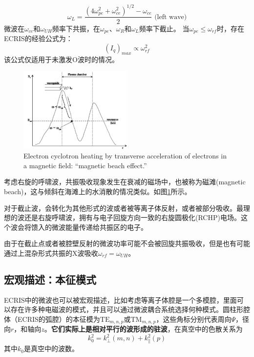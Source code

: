 \documentclass[fontset=windows]{article}
\begin{document}
\begin{enumerate}
\begin{enumerate}
\begin{equation}
        \end{equation}
        \begin{equation}
            \omega_L=\frac{(4\omega_{pe}^2+\omega_{ce}^2)^{1/2}-\omega_{ce}}{2}\text{  (left wave)}
        \end{equation}
        微波在$\omega_{ce}$和$\omega_{UH}$频率下共振，在$\omega_{pe}$、$\omega_{R}$和$\omega_{L}$频率下截止。
        当$\omega_{pe}\le\omega_{rf}$时，存在ECRIS的经验公式为：
        \begin{equation}
            (I_q)_{max}\propto\omega_{rf}^2
            \label{w^2}
        \end{equation}
        该公式仅适用于未激发O波时的情况。
    \end{enumerate}
\end{enumerate}
\begin{figure}
    \centering
    \includegraphics[width=0.5\textwidth]{magnetic beach effect.png}
    \caption{Electron cyclotron heating by transverse acceleration of electrons in a magnetic field: “magnetic beach effect.”}
    \label{f-1}
\end{figure}

考虑右旋的呼啸波，共振吸收现象发生在衰减的磁场中，也被称为磁滩(magnetic beach)，这与倾斜在海滩上的水消散的情况类似。如图\ref{f-1}所示。

对于截止波，会转化为其他形式的波或者被等离子体反射，或者被部分吸收。最理想的波还是右旋呼啸波，拥有与电子回旋方向一致的右旋圆极化(RCHP)电场。这个波会将馈入的微波能量传递给共振区的电子。

由于在截止点或者被腔壁反射的微波功率可能不会被回旋共振吸收，但是也有可能通过上混杂形式共振的X波吸收$\omega_{rf}=\omega_{UH}$。

\subsection{宏观描述：本征模式}
ECRIS中的微波也可以被宏观描述，比如考虑等离子体腔是一个多模腔，里面可以存在许多种电磁波的模式，并且可以通过微波耦合系统选择何种模式。圆柱形腔体（ECRIS的弧腔）的本征模为$\text{TE}_{m,n,p}$或$\text{TM}_{m,n,p}$，这些角标分别代表周向$\Psi$，径向$r$，和轴向$z$。\textbf{它们实际上是相对平行的波形成的驻波}，在真空中的色散关系为
\begin{equation}
    k_0^2=k_\perp^2(m,n)+k_\parallel^2(p)
\end{equation}
其中$k_0$是真空中的波数。
\end{document}
